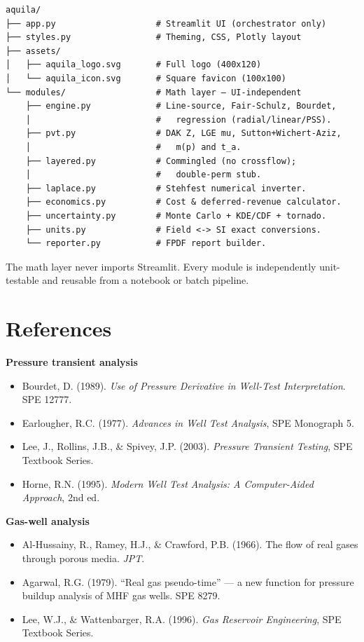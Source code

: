\documentclass[11pt,a4paper]{article}
\begin{document}
\begin{lstlisting}[caption={Aquila module layout.}]
aquila/
├── app.py                    # Streamlit UI (orchestrator only)
├── styles.py                 # Theming, CSS, Plotly layout
├── assets/
│   ├── aquila_logo.svg       # Full logo (400x120)
│   └── aquila_icon.svg       # Square favicon (100x100)
└── modules/                  # Math layer — UI-independent
    ├── engine.py             # Line-source, Fair-Schulz, Bourdet,
    │                         #   regression (radial/linear/PSS).
    ├── pvt.py                # DAK Z, LGE mu, Sutton+Wichert-Aziz,
    │                         #   m(p) and t_a.
    ├── layered.py            # Commingled (no crossflow);
    │                         #   double-perm stub.
    ├── laplace.py            # Stehfest numerical inverter.
    ├── economics.py          # Cost & deferred-revenue calculator.
    ├── uncertainty.py        # Monte Carlo + KDE/CDF + tornado.
    ├── units.py              # Field <-> SI exact conversions.
    └── reporter.py           # FPDF report builder.
\end{lstlisting}

The math layer never imports Streamlit. Every module is independently
unit-testable and reusable from a notebook or batch pipeline.

\section*{References}
\small

\noindent\textbf{Pressure transient analysis}\par
\begin{itemize}[leftmargin=*,nosep]
\item Bourdet, D. (1989). \emph{Use of Pressure Derivative in Well-Test Interpretation}. SPE 12777.
\item Earlougher, R.C. (1977). \emph{Advances in Well Test Analysis}, SPE Monograph 5.
\item Lee, J., Rollins, J.B., \& Spivey, J.P. (2003). \emph{Pressure Transient Testing}, SPE Textbook Series.
\item Horne, R.N. (1995). \emph{Modern Well Test Analysis: A Computer-Aided Approach}, 2nd ed.
\end{itemize}

\noindent\textbf{Gas-well analysis}\par
\begin{itemize}[leftmargin=*,nosep]
\item Al-Hussainy, R., Ramey, H.J., \& Crawford, P.B. (1966). The flow of real gases through porous media. \emph{JPT}.
\item Agarwal, R.G. (1979). ``Real gas pseudo-time'' — a new function for pressure buildup analysis of MHF gas wells. SPE 8279.
\item Lee, W.J., \& Wattenbarger, R.A. (1996). \emph{Gas Reservoir Engineering}, SPE Textbook Series.
\end{itemize}
\end{document}
